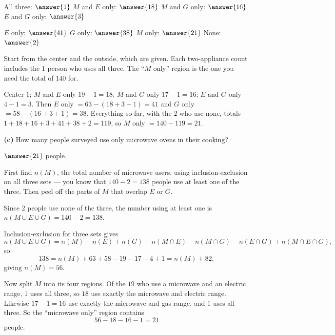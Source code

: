\documentclass[12pt]{ximera}
\begin{document}
\begin{problem}
\begin{prompt}
All three: $\answer{1}$ \qquad
$M$ and $E$ only: $\answer{18}$ \qquad
$M$ and $G$ only: $\answer{16}$ \qquad
$E$ and $G$ only: $\answer{3}$

\smallskip
$E$ only: $\answer{41}$ \qquad
$G$ only: $\answer{38}$ \qquad
$M$ only: $\answer{21}$ \qquad
None: $\answer{2}$

\begin{hint}
Start from the center and the outside, which are given. Each two-appliance count
includes the $1$ person who uses all three. The ``$M$ only'' region is the one you need
the total of $140$ for.
\end{hint}

\begin{feedback}
Center $1$; $M$ and $E$ only $19-1=18$; $M$ and $G$ only $17-1=16$; $E$ and $G$ only
$4-1=3$. Then $E$ only $=63-(18+3+1)=41$ and $G$ only $=58-(16+3+1)=38$. Everything so
far, with the $2$ who use none, totals $1+18+16+3+41+38+2=119$, so $M$ only $=140-119=21$.
\end{feedback}
\end{prompt}

\begin{prompt}
\textbf{(c)} How many people surveyed use only microwave ovens in their cooking?

$\answer{21}$ people.

\begin{hint}
First find $n(M)$, the total number of microwave users, using inclusion-exclusion on
all three sets --- you know that $140-2=138$ people use at least one of the three.
Then peel off the parts of $M$ that overlap $E$ or $G$.
\end{hint}

\begin{feedback}
Since $2$ people use none of the three, the number using at least one is
$n(M\cup E\cup G)=140-2=138$.

Inclusion-exclusion for three sets gives
\[
n(M\cup E\cup G)=n(M)+n(E)+n(G)-n(M\cap E)-n(M\cap G)-n(E\cap G)+n(M\cap E\cap G),
\]
so
\[
138 = n(M) + 63 + 58 - 19 - 17 - 4 + 1 = n(M) + 82,
\]
giving $n(M)=56$.

Now split $M$ into its four regions. Of the $19$ who use a microwave and an electric
range, $1$ uses all three, so $18$ use exactly the microwave and electric range.
Likewise $17-1=16$ use exactly the microwave and gas range, and $1$ uses all three.
So the ``microwave only'' region contains
\[ 56 - 18 - 16 - 1 = 21 \]
people.
\end{feedback}
\end{prompt}
\end{problem}
\end{document}
